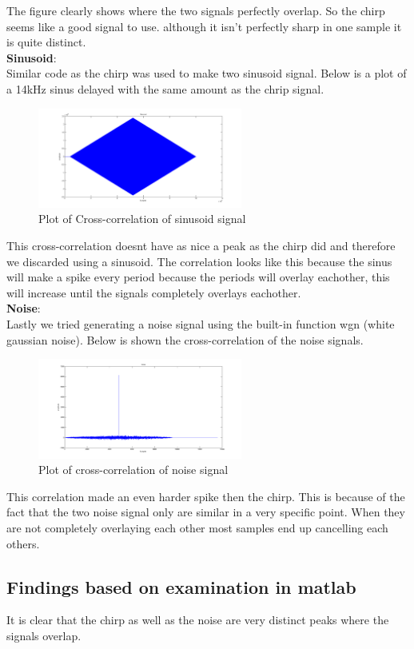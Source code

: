 The figure clearly shows where the two signals perfectly overlap. So the chirp seems like a good signal to use. although it isn't perfectly sharp in one sample it is quite distinct.\\
\textbf{Sinusoid}:\\
Similar code as the chirp was used to make two sinusoid signal. Below is a plot of a 14kHz sinus delayed with the same amount as the chrip signal.\\
\begin{figure}[H]
\centering
\includegraphics[width=0.6\textwidth]{billeder/sinus_xcorr_fig}
\caption{Plot of Cross-correlation of sinusoid signal}
\label{fig:sinus_xcorr_plot}
\end{figure}
This cross-correlation doesnt have as nice a peak as the chirp did and therefore we discarded using a sinusoid. The correlation looks like this because the sinus will make a spike every period because the periods will overlay eachother, this will increase until the signals completely overlays eachother.\\
\textbf{Noise}:\\
Lastly we tried generating a noise signal using the built-in function wgn (white gaussian noise). Below is shown the cross-correlation of the noise signals.\\
\begin{figure}[H]
\centering
\includegraphics[width=0.6\textwidth]{billeder/noise_xcorr_fig}
\caption{Plot of cross-correlation of noise signal}
\label{fig:noise_xcorr_plot}
\end{figure}
This correlation made an even harder spike then the chirp. This is because of the fact that the  two noise signal only are similar in a very specific point. When they are not completely overlaying each other most samples end up cancelling each others.
\subsection{Findings based on examination in matlab}
It is clear that the chirp as well as the noise are very distinct peaks where the signals overlap. 

